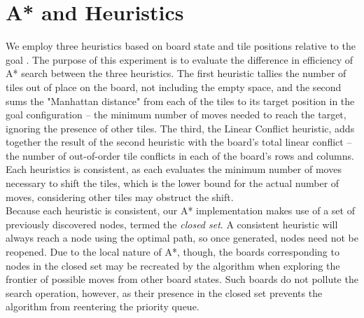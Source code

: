 
\section{A* and Heuristics}
\label{sec:background}

We employ three heuristics based on board state and tile positions relative to the goal \cite{aima}.  The purpose of this experiment is to evaluate the difference in efficiency of A* search between the three heuristics.  The first heuristic tallies the number of tiles out of place on the board, not including the empty space, and the second sums the "Manhattan distance" from each of the tiles to its target position in the goal configuration -- the minimum number of moves needed to reach the target, ignoring the presence of other tiles.  The third, the Linear Conflict heuristic, adds together the result of the second heuristic with the board's total linear conflict -- the number of out-of-order tile conflicts in each of the board's rows and columns. \cite{GeneratingAdmissableHeuristics}  Each heuristics is consistent, as each evaluates the minimum number of moves necessary to shift the tiles, which is the lower bound for the actual number of moves, considering other tiles may obstruct the shift. \\

Because each heuristic is consistent, our A* implementation makes use of a set of previously discovered nodes, termed the \emph{closed set}.  A consistent heuristic will always reach a node using the optimal path, so once generated, nodes need not be reopened.  Due to the local nature of A*, though, the boards corresponding to nodes in the closed set may be recreated by the algorithm when exploring the frontier of possible moves from other board states.  Such boards do not pollute the search operation, however, as their presence in the closed set prevents the algorithm from reentering the priority queue.